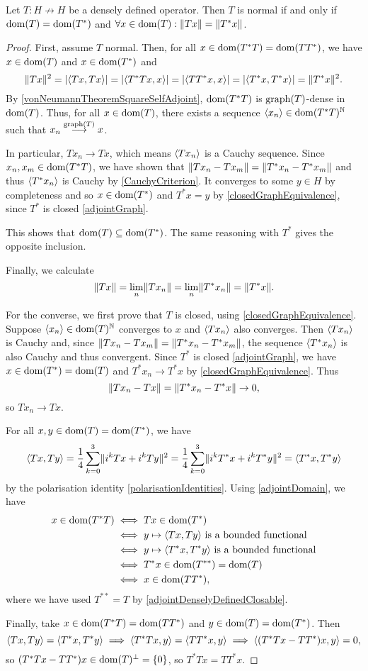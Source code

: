 \begin{proposition} \label{normalCriterion}
Let $T: H\not\to H$ be a densely defined operator. Then $T$ is normal \textup{if and only if} $\operatorname{dom}(T) = \operatorname{dom}(T^*)$ and $\forall x\in \operatorname{dom}(T): \lVert Tx\rVert = \lVert T^*x\rVert$.
\end{proposition}
\begin{proof}
First, assume $T$ normal. Then, for all $x\in \operatorname{dom}(T^*T) = \operatorname{dom}(TT^*)$, we have $x\in \operatorname{dom}(T)$ and $x\in \operatorname{dom}(T^*)$ and
\[ \norm{Tx}^2 = |\inner{Tx,Tx}| = |\inner{T^*Tx,x}| = |\inner{TT^*x,x}| = |\inner{T^*x,T^*x}| = \norm{T^*x}^2. \]
By \ref{vonNeumannTheoremSquareSelfAdjoint}, $\operatorname{dom}(T^*T)$ is $\operatorname{graph}(T)$-dense in $\operatorname{dom}(T)$. Thus, for all $x\in \operatorname{dom}(T)$, there exists a sequence $\left\langle x_n \right\rangle\in \operatorname{dom}(T^*T)^{\mathbb{N}}$ such that $x_n \overset{\operatorname{graph}(T)}{\longrightarrow} x$.

In particular, $Tx_n \to Tx$, which means $\left\langle Tx_n \right\rangle$ is a Cauchy sequence. Since $x_n,x_m\in \operatorname{dom}(T^*T)$, we have shown that $\lVert Tx_n - Tx_m\rVert = \lVert T^*x_n - T^*x_m\rVert$ and thus $\left\langle T^*x_n \right\rangle$ is Cauchy by \ref{CauchyCriterion}. It converges to some $y\in H$ by completeness and so $x\in \operatorname{dom}(T^*)$ and $T^*x = y$ by \ref{closedGraphEquivalence}, since $T^*$ is closed \ref{adjointGraph}. 

This shows that $\operatorname{dom}(T) \subseteq \operatorname{dom}(T^*)$. The same reasoning with $T^*$ gives the opposite inclusion.

Finally, we calculate
\[ \lVert Tx\rVert = \lim_n\lVert Tx_n\rVert = \lim_n \lVert T^*x_n\rVert = \lVert T^*x\rVert. \]

For the converse, we first prove that $T$ is closed, using \ref{closedGraphEquivalence}. Suppose $\left\langle x_n \right\rangle\in \operatorname{dom}(T)^{\mathbb{N}}$ converges to $x$ and $\left\langle Tx_n \right\rangle$ also converges. Then $\left\langle Tx_n \right\rangle$ is Cauchy and, since $\lVert Tx_n - Tx_m\rVert = \lVert T^*x_n - T^*x_m\rVert$, the sequence $\left\langle T^*x_n \right\rangle$ is also Cauchy and thus convergent. Since $T^*$ is closed \ref{adjointGraph}, we have $x\in \operatorname{dom}(T^*) = \operatorname{dom}(T)$ and $T^*x_n \to T^*x$ by \ref{closedGraphEquivalence}. Thus
\[ \lVert Tx_n - Tx\rVert = \lVert T^*x_n - T^*x\rVert \to 0, \]
so $Tx_n \to Tx$.

For all $x,y\in\operatorname{dom}(T) = \operatorname{dom}(T^*)$, we have
\[ \inner{Tx,Ty} = \frac{1}{4}\sum_{k=0}^3\norm{i^kTx+ i^kTy}^2 = \frac{1}{4}\sum_{k=0}^3\norm{i^kT^*x+ i^kT^*y}^2 = \inner{T^*x, T^*y} \]
by the polarisation identity \ref{polarisationIdentities}.
Using \ref{adjointDomain}, we have
\begin{align*}
x\in \dom(T^*T) &\iff Tx \in \dom(T^*) \\
&\iff \text{$y\mapsto \inner{Tx, Ty}$ is a bounded functional} \\
&\iff \text{$y\mapsto \inner{T^*x, T^*y}$ is a bounded functional} \\ 
&\iff T^*x \in \dom(T^{**}) = \dom(T) \\
&\iff x\in \dom(TT^*), 
\end{align*}
where we have used $T^{**} = T$ by \ref{adjointDenselyDefinedClosable}.

Finally, take $x\in \operatorname{dom}(T^*T) = \operatorname{dom}(TT^*)$ and $y\in \operatorname{dom}(T) = \operatorname{dom}(T^*)$. Then
\[ \inner{Tx,Ty} = \inner{T^*x, T^*y} \implies \inner{T^*Tx,y} = \inner{TT^*x, y} \implies \inner{(T^*Tx - TT^*)x, y} = 0, \]
so $(T^*Tx - TT^*)x \in \operatorname{dom}(T)^\perp = \{0\}$, so $T^*Tx = TT^*x$.
\end{proof}

